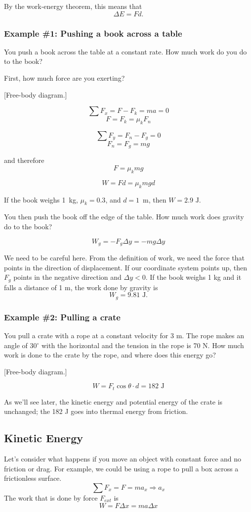 By the work-energy theorem, this means that
$$\Delta E=Fd.$$

\subsubsection*{Example \#1: Pushing a book across a table}
You push a book across the table at a constant rate. How much work do you do to the book?

First, how much force are you exerting?

[Free-body diagram.]
\vspace{3cm}

$$\sum F_x = F - F_k = ma = 0$$
$$F = F_k = \mu_kF_n$$

$$\sum F_y = F_n - F_g = 0$$
$$F_n = F_g = mg$$

and therefore
$$F = \mu_kmg$$

$$W=Fd=\mu_kmgd$$

If the book weighs 1~kg, $\mu_k=0.3$, and $d=1$~m, then $\boxed{W=2.9\mbox{ J}}$.

You then push the book off the edge of the table. How much work does gravity do to the book?

$$W_g=-F_g\Delta{y}=-mg\Delta{y}$$

We need to be careful here. From the definition of work, we need the force that points in the direction of displacement. If our coordinate system points up, then $F_g$ points in the negative direction and $\Delta{y}<0$. If the book weighs 1 kg and it falls a distance of 1 m, the work done by gravity is 
$$\boxed{W_g=9.81\mbox{ J}}.$$

\subsubsection*{Example \#2: Pulling a crate}
You pull a crate with a rope at a constant velocity for 3 m. The rope makes an angle of 30$^\circ$ with the horizontal and the tension in the rope is 70 N. How much work is done to the crate by the rope, and where does this energy go?

[Free-body diagram.]
\vspace{5cm}

$$W=F_t\cos\theta\cdot{d}=182\mbox{ J}$$

As we'll see later, the kinetic energy and potential energy of the crate is unchanged; the 182 J goes into thermal energy from friction.


\subsection{Kinetic Energy}
Let's consider what happens if you move an object with constant force and no friction or drag. For example, we could be using a rope to pull a box across a frictionless surface.
$$\sum F_x=F=ma_x\Rightarrow a_x$$
The work that is done by force $F_{ext}$ is
$$W = F\Delta x = ma\Delta x$$

